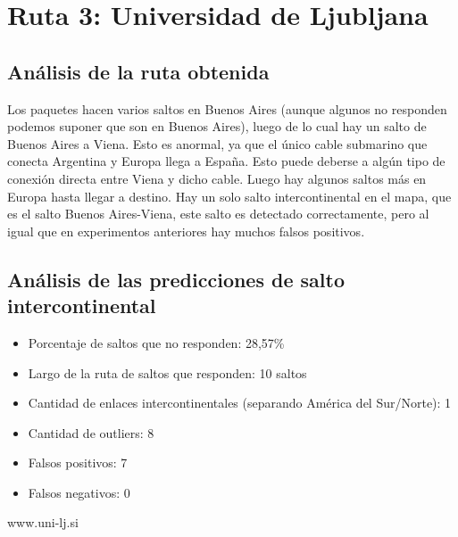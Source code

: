 \section{Ruta 3: Universidad de Ljubljana}

\subsection{Análisis de la ruta obtenida}

Los paquetes hacen varios saltos en Buenos Aires (aunque algunos no responden podemos suponer que son en Buenos Aires), luego de lo cual hay un salto de Buenos Aires a Viena. Esto es anormal, ya que el único cable submarino que conecta Argentina y Europa llega a España. Esto puede deberse a algún tipo de conexión directa entre Viena y dicho cable. Luego hay algunos saltos más en Europa hasta llegar a destino. Hay un solo salto intercontinental en el mapa, que es el salto Buenos Aires-Viena, este salto es detectado correctamente, pero al igual que en experimentos anteriores hay muchos falsos positivos.

\subsection{Análisis de las predicciones de salto intercontinental}

\begin{itemize}
	\item Porcentaje de saltos que no responden: 28,57\%
	\item Largo de la ruta de saltos que responden: 10 saltos 
	\item Cantidad de enlaces intercontinentales (separando América del Sur/Norte): 1
	\item Cantidad de outliers: 8
	\item Falsos positivos: 7
	\item Falsos negativos: 0
\end{itemize}

www.uni-lj.si


